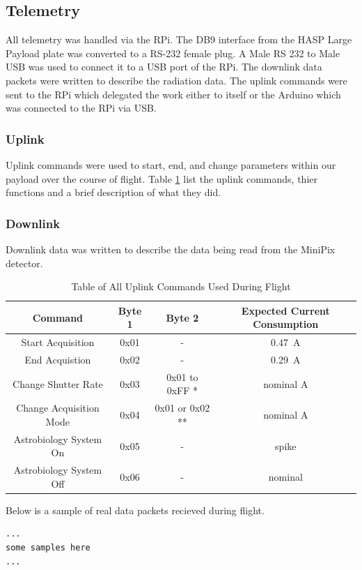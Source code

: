 \subsection{Telemetry}
\label{sec:Telemetry}

All telemetry was handled via the RPi. The DB9 interface from the HASP Large Payload plate was converted to a 
RS-232 female plug. A Male RS 232 to Male USB was used to connect it to a USB port of the RPi. 
The downlink data packets were written to describe the radiation data. 
The uplink commands were sent to the RPi which delegated the work either to itself or the Arduino which 
was connected to the RPi via USB.

\subsubsection{Uplink}
\label{sec:Uplink} 
Uplink commands were used to start, end, and change parameters within our payload over the course of flight. 
Table \ref{tab:All-Commands} list the uplink commands, thier functions and a brief description of what they did. 

\subsubsection{Downlink}
\label{sec:Downlink}
Downlink data was written to describe the data being read from the MiniPix detector. 

\begin{table}[h!]
\centering
\caption{Table of All Uplink Commands Used During Flight}
\label{tab:All-Commands}
\bigskip
\begin{tabular}{c|c|c|c}
\hline
\hline
\multicolumn{1}{c|}{\bfseries Command} & \multicolumn{1}{c|}{\bfseries Byte 1} &  \multicolumn{1}{c|}{\bfseries Byte 2} & \multicolumn{1}{c}{\bfseries Expected Current Consumption} \\
\hline
	Start Acquisition  		& 0x01	& -	 				& \SI{0.47}{\ampere}    \\ \hline
	End Acquistion 			& 0x02	& -	 				& \SI{0.29}{\ampere}    \\ \hline
	Change Shutter Rate 	& 0x03 	& 0x01 to 0xFF *	& nominal A 		\\ \hline
	Change Acquisition Mode	& 0x04	& 0x01 or 0x02 **	& nominal A		\\ \hline
	Astrobiology System On	& 0x05	& -					& spike			\\ \hline
	Astrobiology System Off	& 0x06	& -					& nominal		\\ \hline
\end{tabular}
\medskip
\end{table}

Below is a sample of real data packets recieved during flight. 

\lstset{basicstyle=\small, numbers=left, xleftmargin=2em, frame=tb, label = Downlinks, framexleftmargin=1.5em}
\begin{lstlisting}[caption = Sample of downlinked data packets ID: 15667 - 15670.]
...
some samples here
...
\end{lstlisting}

